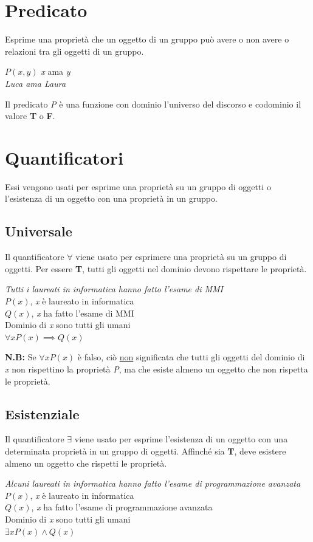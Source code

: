 \section{Predicato}
Esprime una proprietà che un oggetto di un gruppo può avere o non avere o relazioni tra gli oggetti di un gruppo.
\begin{example}
$P(x, y)$ \textit{x} ama \textit{y} \\
\emph{Luca ama Laura}
\end{example}

Il predicato \textit{P} è una funzione con dominio l'universo del discorso e codominio il valore \textbf{T} o \textbf{F}.

\section{Quantificatori}
Essi vengono usati per esprime una proprietà su un gruppo di oggetti o l'esistenza di un oggetto con una proprietà in un gruppo.

\subsection{Universale}
Il quantificatore $\forall$ viene usato per esprimere una proprietà su un gruppo di oggetti. Per essere \textbf{T}, tutti gli oggetti nel dominio devono rispettare le proprietà.
\begin{example}
\emph{Tutti i laureati in informatica hanno fatto l'esame di MMI} \\
$P(x)$, \textit{x} è laureato in informatica \\
$Q(x)$, \textit{x} ha fatto l'esame di MMI \\
Dominio di \textit{x} sono tutti gli umani \\
$\forall xP(x) \implies Q(x)$
\end{example}

\textbf{N.B:} Se $\forall xP(x)$ è falso, ciò \underline{non} significata che tutti gli oggetti del dominio di \textit{x} non rispettino la proprietà \textit{P}, ma che esiste almeno un oggetto che non rispetta le proprietà.

\subsection{Esistenziale}
Il quantificatore $\exists$ viene usato per esprime l'esistenza di un oggetto con una determinata proprietà in un gruppo di oggetti. Affinché sia \textbf{T}, deve esistere almeno un oggetto che rispetti le proprietà.
\begin{example}
\emph{Alcuni laureati in informatica hanno fatto l'esame di programmazione avanzata} \\
$P(x)$, \textit{x} è laureato in informatica \\
$Q(x)$, \textit{x} ha fatto l'esame di programmazione avanzata \\
Dominio di \textit{x} sono tutti gli umani \\
$\exists xP(x) \wedge Q(x)$
\end{example}

